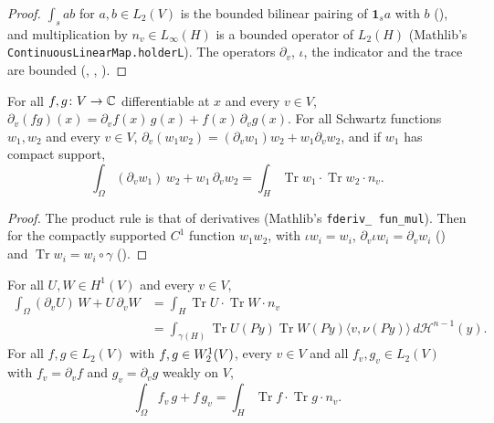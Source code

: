 \begin{proof}
\leanok
$\int_s a b$ for $a, b \in L_2(V)$ is the bounded bilinear pairing of $\mathbf 1_s a$
with $b$ (), and multiplication by
$n_v \in L_\infty(H)$ is a bounded operator of $L_2(H)$ (Mathlib's
\texttt{ContinuousLinearMap.\allowbreak holderL}). The operators $\partial_v$, $\iota$, the
indicator and the trace are bounded (,
, ).
\end{proof}

\begin{lemma}
\label{lem:green-schwartz}
\leanok
{}
For all $f, g \colon V \to \mathbb{C}$ differentiable at $x$ and every $v \in V$,
$\partial_v (f g)(x) = \partial_v f(x) \, g(x) + f(x) \, \partial_v g(x)$. For all Schwartz
functions $w_1, w_2$ and every $v \in V$,
$\partial_v (w_1 w_2) = (\partial_v w_1) w_2 + w_1 \partial_v w_2$, and if $w_1$ has compact
support,
\[
  \int_\Omega (\partial_v w_1) \, w_2 + w_1 \, \partial_v w_2
  = \int_H \operatorname{Tr} w_1 \cdot \operatorname{Tr} w_2 \cdot n_v .
\]
\end{lemma}

\begin{proof}
\leanok
The product rule is that of derivatives (Mathlib's \texttt{fderiv\_\allowbreak
fun\_\allowbreak mul}). Then  for the compactly supported $C^1$ function
$w_1 w_2$, with $\iota w_i = w_i$, $\partial_v \iota w_i = \partial_v w_i$
() and $\operatorname{Tr} w_i = w_i \circ \gamma$
().
\end{proof}

\begin{theorem}
\label{thm:graph-green}
\leanok
{}
For all $U, W \in H^1(V)$ and every $v \in V$,
\begin{align*}
  \int_\Omega (\partial_v U) \, W + U \, \partial_v W
  &= \int_H \operatorname{Tr} U \cdot \operatorname{Tr} W \cdot n_v \\
  &= \int_{\gamma(H)} \operatorname{Tr} U(P y) \operatorname{Tr} W(P y)
    \langle v, \nu(P y) \rangle \, d\mathcal H^{n-1}(y) .
\end{align*}
For all $f, g \in L_2(V)$ with $f, g \in W^{1}_{2}(V)$, every $v \in V$ and all
$f_v, g_v \in L_2(V)$ with $f_v = \partial_v f$ and $g_v = \partial_v g$ weakly on $V$,
\[
  \int_\Omega f_v \, g + f \, g_v
  = \int_H \operatorname{Tr} f \cdot \operatorname{Tr} g \cdot n_v .
\]
\end{theorem}

